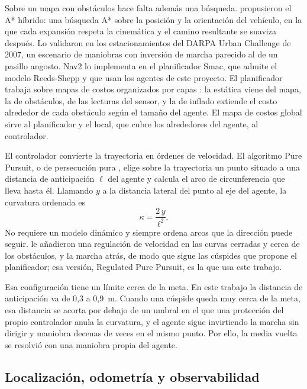 Sobre un mapa con obstáculos hace falta además una búsqueda. \textcite{dolgov2010path} propusieron el
A* híbrido: una búsqueda A* sobre la posición y la orientación del vehículo, en la que cada expansión
respeta la cinemática y el camino resultante se suaviza después. Lo validaron en los estacionamientos
del DARPA Urban Challenge de 2007, un escenario de maniobras con inversión de marcha parecido al de un
pasillo angosto. Nav2 lo implementa en el planificador Smac, que admite el modelo Reeds-Shepp
\autocite{macenski2024smac} y que usan los agentes de este proyecto. El planificador trabaja sobre mapas
de costos organizados por capas \autocite{macenski2023survey}: la estática viene del mapa, la de
obstáculos, de las lecturas del sensor, y la de inflado extiende el costo alrededor de cada obstáculo
según el tamaño del agente. El mapa de costos global sirve al planificador y el local, que cubre los
alrededores del agente, al controlador.

El controlador convierte la trayectoria en órdenes de velocidad. El algoritmo Pure Pursuit, o de persecución pura \autocite{macenski2023rpp}, elige sobre la trayectoria un punto
situado a una distancia de anticipación $\ell$ del agente y calcula el arco de
circunferencia que lleva hasta él. Llamando $y$ a la distancia lateral del punto
al eje del agente, la curvatura ordenada es
\begin{equation}
  \kappa = \frac{2\,y}{\ell^{2}} .
\end{equation}
No requiere un modelo dinámico y siempre ordena arcos que la dirección puede
seguir. \textcite{macenski2023rpp} le añadieron una regulación de velocidad en
las curvas cerradas y cerca de los obstáculos, y la marcha atrás, de modo que sigue las cúspides que propone el planificador; esa versión, Regulated Pure Pursuit, es la que usa este trabajo.

Esa configuración tiene un límite cerca de la meta. En este trabajo la distancia de anticipación va de 0,3 a 0,9~m. Cuando una cúspide queda muy cerca de la meta, esa distancia se acorta por debajo de un
umbral en el que una protección del propio controlador anula la curvatura, y el agente sigue
invirtiendo la marcha sin dirigir y maniobra decenas de veces en el mismo punto. Por ello, la media
vuelta se resolvió con una maniobra propia del agente.

\subsection{Localización, odometría y observabilidad}
\label{sec:teo-localizacion}

